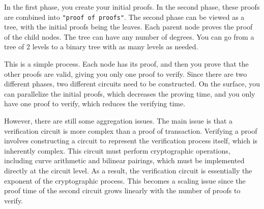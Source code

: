   In the first phase, you create your initial proofs.
  In the second phase, these proofs are combined into \verb|"proof of proofs"|. 
  The second phase can be viewed as a tree, with the initial proofs being the leaves. Each parent node proves the proof of the child nodes.
  The tree can have any number of degrees. You can go from a tree of 2 levels to a binary tree with as many levels as needed.
 
 This is a simple process. Each node has its proof, and then you prove that the other proofs are valid, giving you only one proof
 to verify. Since there are two different phases, two different circuits need to be constructed.
 On the surface, you can parallelize the initial proofs, which decreases the proving time, and you only have one proof to verify, which reduces the verifying time.
 
 However, there are still some aggregation issues.
 The main issue is that a verification circuit is more complex than a proof of transaction.
 Verifying a proof involves constructing a circuit to represent the verification process itself, which is inherently complex. 
 This circuit must perform cryptographic operations, including curve arithmetic and bilinear pairings, which must be implemented directly at the circuit level. 
 As a result, the verification circuit is essentially the exponent of the cryptographic process.
 This becomes a scaling issue since the proof time of the second circuit grows linearly with the number of proofs to verify. \cite{Nova23}

